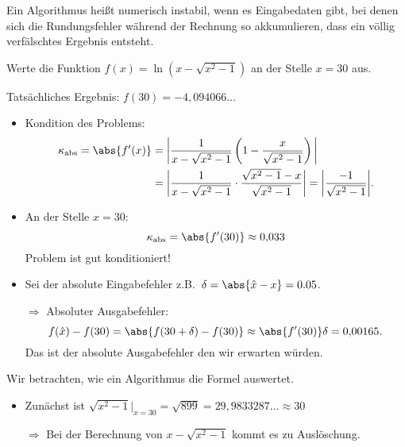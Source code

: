 Ein Algorithmus heißt numerisch instabil, wenn es Eingabedaten gibt, bei denen sich
die Rundungsfehler während der Rechnung so akkumulieren, dass ein völlig verfälschtes Ergebnis entsteht.

\begin{bsp}
Werte die Funktion $f(x) = \ln(x - \sqrt{x^2-1})$ an der Stelle $x = 30 $ aus.

\medskip

Tatsächliches Ergebnis:  $f(30) = -4{,}094066\dots$

\begin{itemize}
  \item Kondition des Problems:
   \begin{align*}
    \kappa_\text{abs} = \abs{f'(x)}
    &=
    \bigg|\frac{1}{x-\sqrt{x^2-1}}\left(1-\frac{x}{\sqrt{x^2-1}}\right)\bigg| \\
    &=
    \bigg| \frac{1}{x-\sqrt{x^2-1}} \cdot \frac{\sqrt{x^2-1}-x}{\sqrt{x^2-1}}\bigg|
    = \bigg| \frac{-1}{\sqrt{x^2-1}} \bigg|.
   \end{align*}
  \item An der Stelle $x = 30$:
    \begin{equation*}
     \kappa_\text{abs} = \abs{f'(30)} \approx 0{,}033
    \end{equation*}
    Problem ist gut konditioniert!

  \item Sei der absolute Eingabefehler z.B.\ $\delta = \abs{\hat{x} - x} = 0.05$.

   $\Rightarrow$ Absoluter Ausgabefehler:
   \begin{equation*}
    f(\hat{x}) - f(30) = \abs{f(30 + \delta) - f(30)}\approx \abs{f'(30)}\delta = 0{,}00165.
   \end{equation*}
   Das ist der absolute Ausgabefehler den wir erwarten würden.
\end{itemize}

Wir betrachten, wie ein Algorithmus die Formel auswertet.

\begin{itemize}
  \item Zunächst ist $\sqrt{x^2 - 1}\big|_{x=30} = \sqrt{899} = 29{,}9833287...\approx 30$

   $\Rightarrow$ Bei der Berechnung von $x - \sqrt{x^2 -1}$ kommt es zu Auslöschung.


\end{itemize}
\end{bsp}
